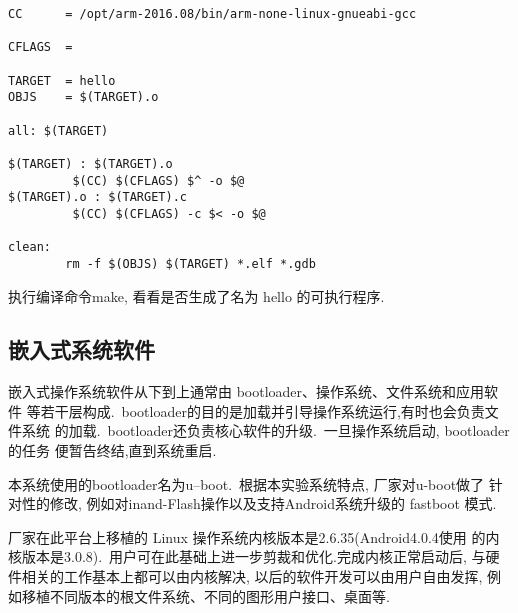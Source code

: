 \begin{lstlisting}[frame=trBL]
CC      = /opt/arm-2016.08/bin/arm-none-linux-gnueabi-gcc

CFLAGS  =

TARGET  = hello
OBJS    = $(TARGET).o

all: $(TARGET)

$(TARGET) : $(TARGET).o
         $(CC) $(CFLAGS) $^ -o $@
$(TARGET).o : $(TARGET).c
         $(CC) $(CFLAGS) -c $< -o $@

clean:
        rm -f $(OBJS) $(TARGET) *.elf *.gdb
\end{lstlisting}

    执行编译命令make, 看看是否生成了名为 hello 的可执行程序.

\subsection{嵌入式系统软件}
	嵌入式操作系统软件从下到上通常由 bootloader、操作系统、文件系统和应用软件
等若干层构成.~bootloader的目的是加载并引导操作系统运行,有时也会负责文件系统
的加载.~bootloader还负责核心软件的升级.~一旦操作系统启动, bootloader的任务
便暂告终结,直到系统重启.

	本系统使用的bootloader名为u--boot.~根据本实验系统特点, 厂家对u-boot做了
针对性的修改, 例如对inand-Flash操作以及支持Android系统升级的 fastboot 模式.

	厂家在此平台上移植的 Linux 操作系统内核版本是2.6.35(Android4.0.4使用
的内核版本是3.0.8).~用户可在此基础上进一步剪裁和优化.完成内核正常启动后,
与硬件相关的工作基本上都可以由内核解决, 以后的软件开发可以由用户自由发挥,
例如移植不同版本的根文件系统、不同的图形用户接口、桌面等.
